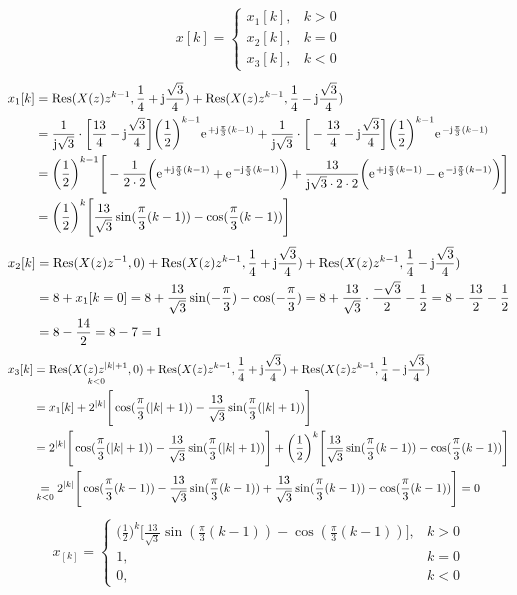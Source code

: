 \begin{align}
	x[k]=\begin{cases}
		x_1[k], &k>0 \\
		x_2[k], &k=0 \\
		x_3[k], &k<0
	\end{cases}
\end{align}
\begin{align}
	x_1[k]&=\mathrm{Res}(X(z)z^{k-1},\frac{1}{4}+\im\frac{\sqrt{3}}{4})+\mathrm{Res}(X(z)z^{k-1},\frac{1}{4}-\im\frac{\sqrt{3}}{4})\nonumber\\
	&=\frac{1}{\im\sqrt{3}}\cdot\bigg [\frac{13}{4}-\im\frac{\sqrt{3}}{4}\bigg]\bigg(\frac{1}{2}\bigg)^{k-1}\e^{+\im\frac{\pi}{3}(k-1)}+\frac{1}{\im\sqrt{3}}\cdot\bigg [-\frac{13}{4}-\im\frac{\sqrt{3}}{4}\bigg]\bigg(\frac{1}{2}\bigg)^{k-1}\e^{-\im\frac{\pi}{3}(k-1)}\nonumber\\
	&=\bigg(\frac{1}{2}\bigg)^{k-1}\Bigg[-\frac{1}{2\cdot2}\bigg(\e^{+\im\frac{\pi}{3}(k-1)}+\e^{-\im\frac{\pi}{3}(k-1)}\bigg)+\frac{13}{\im\sqrt{3}\cdot2\cdot2}\bigg(\e^{+\im\frac{\pi}{3}(k-1)}-\e^{-\im\frac{\pi}{3}(k-1)}\bigg)\Bigg]\nonumber\\
	&=\bigg(\frac{1}{2}\bigg)^{k}\Bigg[\frac{13}{\sqrt{3}}\sin(\frac{\pi}{3}(k-1))-\cos(\frac{\pi}{3}(k-1))\Bigg]
\end{align}
\begin{align}
	x_2[k]&=\mathrm{Res}(X(z)z^{-1},0)+\mathrm{Res}(X(z)z^{k-1},\frac{1}{4}+\im\frac{\sqrt{3}}{4})+\mathrm{Res}(X(z)z^{k-1},\frac{1}{4}-\im\frac{\sqrt{3}}{4})\nonumber\\
	&=8+x_1[k=0]=8+\frac{13}{\sqrt{3}}\sin(-\frac{\pi}{3})-\cos(-\frac{\pi}{3})=8+\frac{13}{\sqrt{3}}\cdot\frac{-\sqrt{3}}{2}-\frac{1}{2}=8-\frac{13}{2}-\frac{1}{2}\nonumber\\
	&=8-\frac{14}{2}=8-7=1
\end{align}
\begin{align}
	x_3[k]&=\underset{k<0}{\mathrm{Res}(X(z)z^{|k|+1},0)}+\mathrm{Res}(X(z)z^{k-1},\frac{1}{4}+\im\frac{\sqrt{3}}{4})+\mathrm{Res}(X(z)z^{k-1},\frac{1}{4}-\im\frac{\sqrt{3}}{4})\nonumber\\
	&=x_1[k]+2^{|k|}\Bigg[\cos(\frac{\pi}{3}(|k|+1))-\frac{13}{\sqrt{3}}\sin(\frac{\pi}{3}(|k|+1))\Bigg]\nonumber\\
	&=2^{|k|}\Bigg[\cos(\frac{\pi}{3}(|k|+1))-\frac{13}{\sqrt{3}}\sin(\frac{\pi}{3}(|k|+1))\Bigg]+\bigg(\frac{1}{2}\bigg)^{k}\Bigg[\frac{13}{\sqrt{3}}\sin(\frac{\pi}{3}(k-1))-\cos(\frac{\pi}{3}(k-1))\Bigg]\nonumber\\
	&\underset{k<0}{=}2^{|k|}\Bigg[\cos(\frac{\pi}{3}(k-1))-\frac{13}{\sqrt{3}}\sin(\frac{\pi}{3}(k-1))+\frac{13}{\sqrt{3}}\sin(\frac{\pi}{3}(k-1))-\cos(\frac{\pi}{3}(k-1))\Bigg]=0
\end{align}
\begin{align}
	x_[k]=\begin{cases}
		\bigg(\frac{1}{2}\bigg)^{k}\Bigg[\frac{13}{\sqrt{3}}\sin(\frac{\pi}{3}(k-1))-\cos(\frac{\pi}{3}(k-1))\Bigg], &k>0 \\
		1, &k=0 \\
		0, &k<0
	\end{cases}
\end{align}
